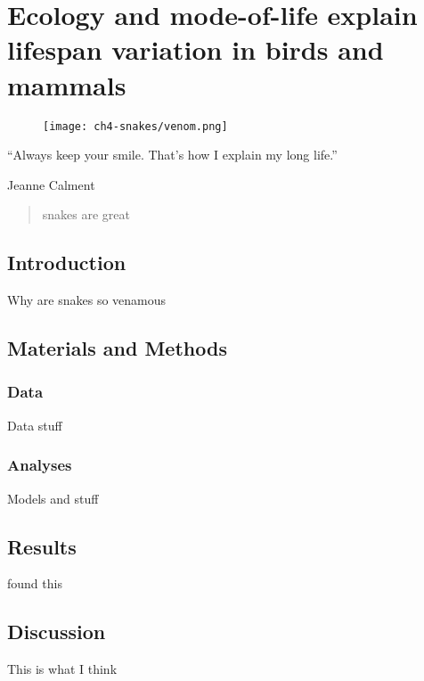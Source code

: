 \chapter[Snake]{Ecology and mode-of-life explain lifespan variation in birds and mammals}
\label{chap:Snake}



\begin{figure}[h]
  \centering
  \texttt{[image: ch4-snakes/venom.png]}
\end{figure}


\begin{quoteshrink}
  ``Always keep your smile. That's how I explain my long life.''
  
\hfill{Jeanne Calment}
\end{quoteshrink}

\begin{abstract}

snakes are great
\end{abstract}

\section{Introduction}

Why are snakes so venamous


\section{Materials and Methods}
\subsection{Data}

Data stuff

\subsection{Analyses}

Models and stuff

\section{Results}


found this

\section{Discussion}

This is what I think
